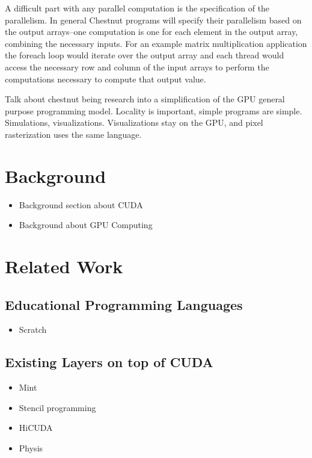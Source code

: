 A difficult part with any parallel computation is the specification of the parallelism. In general Chestnut programs will specify their parallelism based on the output arrays--one computation is one for each element in the output array, combining the necessary inputs. For an example matrix multiplication application the foreach loop would iterate over the output array and each thread would access the necessary row and column of the input arrays to perform the computations necessary to compute that output value. 

Talk about chestnut being research into a simplification of the GPU general purpose programming model. Locality is important, simple programs are simple. Simulations, visualizations. Visualizations stay on the GPU, and pixel rasterization uses the same language.


\section{Background}

\begin{itemize}
\item Background section about CUDA
\item Background about GPU Computing
\end{itemize}

\section{Related Work}

\subsection{Educational Programming Languages}

\begin{itemize}
\item Scratch
\end{itemize}

\subsection{Existing Layers on top of CUDA}
\begin{itemize}
\item Mint
\item Stencil programming
\item HiCUDA
\item Physis
\end{itemize}

